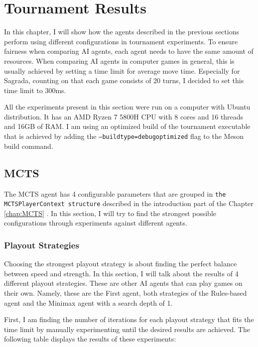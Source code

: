\chapter{Tournament Results}

In this chapter, I will show how the agents described in the previous sections perform using different configurations in tournament experiments. 
To ensure fairness when comparing AI agents, each agent needs to have the same amount of resources. When comparing AI agents
in computer games in general, this is usually achieved by setting a time limit for average move time. Especially for Sagrada,
counting on that each game consists of 20 turns, I decided to set this time limit to 300ms. 

All the experiments present in this section were run on a computer with Ubuntu distribution. It has an AMD Ryzen 7 5800H CPU with 8 cores and 16 threads and 16GB of RAM. 
I am using an optimized build of the tournament executable that is achieved by adding the \texttt{--buildtype=debugoptimized} flag to the Meson build command.

\section{MCTS}

The MCTS agent has 4 configurable parameters that are grouped in \texttt{the MCTSPlayerContext structure} described in the introduction part 
of the Chapter \ref{chap:MCTS} . In this section, I will try to find the strongest possible configurations through experiments against different agents. 

\subsection{Playout Strategies}

Choosing the strongest playout strategy is about finding the perfect balance between speed and strength. In this section, I will talk about
the results of 4 different playout strategies. These are other AI agents that can play games on their own. Namely, these are the First agent,
both strategies of the Rules-based agent and the Minimax agent with a search depth of 1.

First, I am finding the number of iterations for each playout strategy that fits the time limit by manually experimenting until the desired results are achieved.
The following table displays the results of these experiments:

